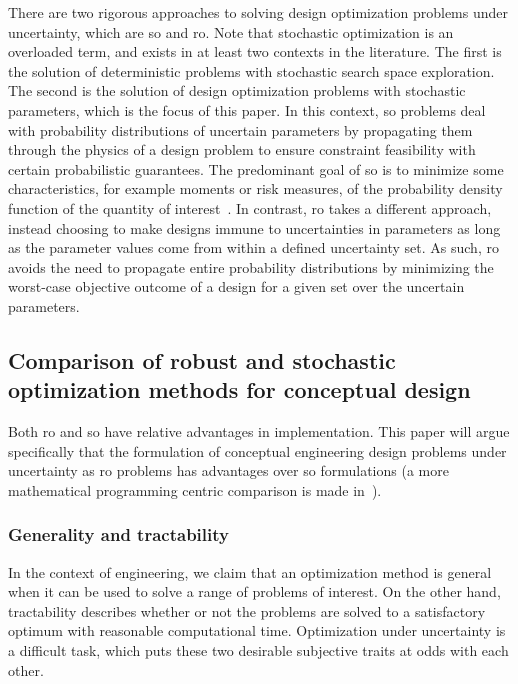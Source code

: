 There are two rigorous approaches to solving design optimization problems under uncertainty,
which are \gls{so} and \gls{ro}. Note that stochastic
optimization is an overloaded term, and exists in at least two contexts in the literature. The first is the solution
of deterministic problems with stochastic search space exploration. The second is the solution
of design optimization problems with stochastic parameters, which is the focus of this paper.
In this context, \gls{so} problems deal with probability distributions of
uncertain parameters by propagating them through the
physics of a design problem to ensure constraint feasibility with certain probabilistic guarantees.
The predominant goal of \gls{so} is to minimize some characteristics, for example moments or risk measures,
of the probability density function of the quantity of interest~\cite{Diwekar2008}.
In contrast, \gls{ro} takes a different approach, instead choosing to make designs immune to
uncertainties in parameters as long as the parameter values come from within a defined
uncertainty set. As such, \gls{ro} avoids the need to propagate entire probability
distributions by minimizing the worst-case objective outcome of a design for a
given set over the uncertain parameters.

\subsection{Comparison of robust and stochastic optimization methods for conceptual design}
\label{sec:robustvsstochastic}

Both \gls{ro} and \gls{so} have relative advantages in implementation. This paper will
argue specifically that the formulation of conceptual engineering design problems under uncertainty as
\gls{ro} problems has advantages over \gls{so} formulations (a more
mathematical programming centric comparison is made in~\cite{Bertsimas2011}).

\subsubsection{Generality and tractability}

In the context of engineering, we claim that an optimization method is general
when it can be used to solve a range of problems of interest. On the other hand,
tractability describes whether or not the problems are solved to a satisfactory
optimum with reasonable computational time. Optimization
under uncertainty is a difficult task, which puts these two desirable subjective traits
at odds with each other.

